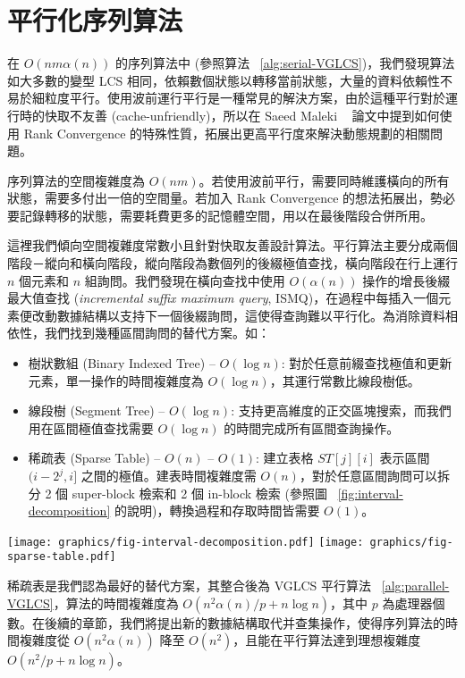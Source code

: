 \section{平行化序列算法} %
\label{sec:parallelSerial}

在 $O(nm \alpha(n))$ 的序列算法中 (參照算法 ~\ref{alg:serial-VGLCS})，我們發現算法如大多數的變型 LCS 相同，依賴數個狀態以轉移當前狀態，大量的資料依賴性不易於細粒度平行。使用波前運行平行是一種常見的解決方案，由於這種平行對於運行時的快取不友善 (cache-unfriendly)，所以在 Saeed Maleki ~\cite{saeed} 論文中提到如何使用 Rank Convergence 的特殊性質，拓展出更高平行度來解決動態規劃的相關問題。



序列算法的空間複雜度為 $O(nm)$。若使用波前平行，需要同時維護橫向的所有狀態，需要多付出一倍的空間量。若加入 Rank Convergence 的想法拓展出，勢必要記錄轉移的狀態，需要耗費更多的記憶體空間，用以在最後階段合併所用。

這裡我們傾向空間複雜度常數小且針對快取友善設計算法。平行算法主要分成兩個階段－縱向和橫向階段，縱向階段為數個列的後綴極值查找，橫向階段在行上運行 $n$ 個元素和 $n$ 組詢問。我們發現在橫向查找中使用 $O(\alpha(n))$ 操作的增長後綴最大值查找 (\emph{incremental suffix maximum query}, ISMQ)，在過程中每插入一個元素便改動數據結構以支持下一個後綴詢問，這使得查詢難以平行化。為消除資料相依性，我們找到幾種區間詢問的替代方案。如：

\begin{itemize}
  \item 樹狀數組 (Binary Indexed Tree) -- $O(\log n)$: 對於任意前綴查找極值和更新元素，單一操作的時間複雜度為 $O(\log n)$，其運行常數比線段樹低。
  \item 線段樹 (Segment Tree) -- $O(\log n)$: 支持更高維度的正交區塊搜索，而我們用在區間極值查找需要 $O(\log n)$ 的時間完成所有區間查詢操作。
  \item 稀疏表 (Sparse Table) -- $O(n)$ -- $O(1)$:
    建立表格 $ST[j][i]$ 表示區間 $(i-2^j,i]$ 之間的極值。建表時間複雜度需 $O(n)$，對於任意區間詢問可以拆分 2 個 super-block 檢索和 2 個 in-block 檢索 (參照圖 ~\ref{fig:interval-decomposition} 的說明)，轉換過程和存取時間皆需要 $O(1)$。
\end{itemize}

\begin{figure*}[!thb]
  \centering
  \texttt{[image: graphics/fig-interval-decomposition.pdf]}
  \texttt{[image: graphics/fig-sparse-table.pdf]}
  \caption{給定一陣列 $A$ 如上圖所述，並且拆成 5 個區塊，每個區塊皆有 4 個元素，若詢問區間 $[2, 18]$ 的最大值，將分成 $B1$ 的內部詢問 (in-block query) $Q_L$、$B5$ 的內部詢問 $Q_R$ 和兩個跨區間詢問 (super-block query) $SQ_L$、$SQ_R$}
  \label{fig:interval-decomposition}
\end{figure*}

稀疏表是我們認為最好的替代方案，其整合後為 VGLCS 平行算法 ~\ref{alg:parallel-VGLCS}，算法的時間複雜度為 $O(n^2 \alpha(n) / p + n \log n)$，其中 $p$ 為處理器個數。在後續的章節，我們將提出新的數據結構取代并查集操作，使得序列算法的時間複雜度從 $O(n^2 \alpha(n))$ 降至 $O(n^2)$，且能在平行算法達到理想複雜度 $O(n^2 / p + n \log n)$。

